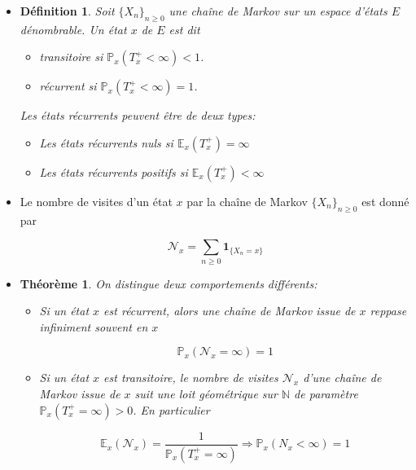 \documentclass[10pt,a4paper,oneside]{article}
\newtheorem{theoreme}{Théorème}
\newtheorem{definition}{Définition}
\begin{document}
\begin{itemize}

\item
\begin{definition}
Soit $\{ X_n \}_{n \geq 0}$ une chaîne de Markov sur un espace d'états $E$ dénombrable. Un état $x$ de $E$ est dit

\begin{itemize}
\item
transitoire si $\mathbb{P}_x(T_x^+ < \infty) < 1$.
\item
récurrent si $\mathbb{P}_x(T_x^+ < \infty) = 1$.
\end{itemize}

Les états récurrents peuvent être de deux types:

\begin{itemize}
\item
Les états récurrents nuls si $\mathbb{E}_x(T_x^+) = \infty$
\item
Les états récurrents positifs si $\mathbb{E}_x(T_x^+) < \infty$
\end{itemize}
\end{definition}

\item
Le nombre de visites d'un état $x$ par la chaîne de Markov $\{ X_n \}_{n \geq 0}$ est donné par

\[ \mathcal{N}_x = \sum_{n \geq 0} \textbf{1}_{ \{ X_n = x \} } \]

\item
\begin{theoreme}
On distingue deux comportements différents:

\begin{itemize}
\item
Si un état $x$ est récurrent, alors une chaîne de Markov issue de $x$ reppase infiniment souvent en $x$

\[ \mathbb{P}_x(\mathcal{N}_x = \infty) = 1 \]

\item
Si un état $x$ est transitoire, le nombre de visites $\mathcal{N}_x$ d'une chaîne de Markov issue de $x$ suit une loit géométrique sur $\mathbb{N}$ de paramètre $\mathbb{P}_x(T_x^+ = \infty) > 0$. En particulier

\[ \mathbb{E}_x(\mathcal{N}_x) = \frac{1}{\mathbb{P}_x(T_x^+ = \infty)} \Rightarrow \mathbb{P}_x(N_x < \infty) = 1 \]

\end{itemize}
\end{theoreme}


\end{itemize}
\end{document}
